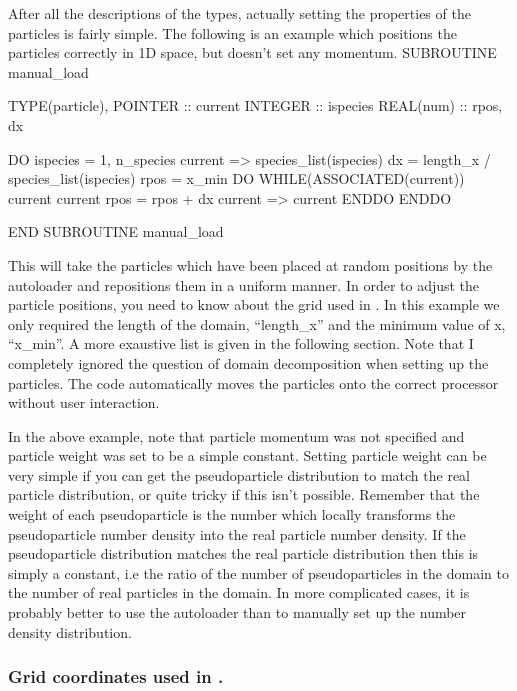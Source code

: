 \documentclass[12pt,a4paper]{article}
\newcommand{\EPOCH}{{\color{warwickdark}\fontfamily{phv}\selectfont{EPOCH}}}
\newenvironment{boxverbatim}{\lboxverbatim{none}}{\endlboxverbatim}
\begin{document}
After all the descriptions of the types, actually setting the properties of
the particles is fairly simple. The following is an example which positions
the particles correctly in 1D space, but doesn't set any momentum.
\begin{boxverbatim}
SUBROUTINE manual_load

  TYPE(particle), POINTER :: current
  INTEGER :: ispecies
  REAL(num) :: rpos, dx

  DO ispecies = 1, n_species
    current => species_list(ispecies)%
    dx = length_x / species_list(ispecies)%
    rpos = x_min
    DO WHILE(ASSOCIATED(current))
      current%
      current%
      rpos = rpos + dx
      current => current%
    ENDDO
  ENDDO

END SUBROUTINE manual_load
\end{boxverbatim}

This will take the particles which have been placed at random positions
by the autoloader and repositions them in a uniform manner. In order to
adjust the particle positions, you need to know about the grid used in
{\EPOCH}. In this example we only required the length of the domain,
``length\_x'' and the minimum value of x, ``x\_min''. A more exaustive
list is given in the following section. Note that
I completely ignored the question of domain decomposition when setting up the
particles. The code automatically moves the particles onto the correct
processor without user interaction.

In the above example, note that particle momentum was not specified and
particle weight was set to be a simple constant. Setting particle weight can
be very simple if you can get the pseudoparticle distribution to match the
real particle distribution, or quite tricky if this isn't possible. Remember
that the weight of each pseudoparticle is the number which locally transforms
the pseudoparticle number density into the real particle number density. If
the pseudoparticle distribution matches the real particle distribution then
this is simply a constant, i.e the ratio of the number of pseudoparticles in
the domain to the number of real particles in the domain. In more complicated
cases, it is probably better to use the autoloader than to manually set up the
number density distribution.

\subsubsection{Grid coordinates used in {\EPOCH}.}
\end{document}
